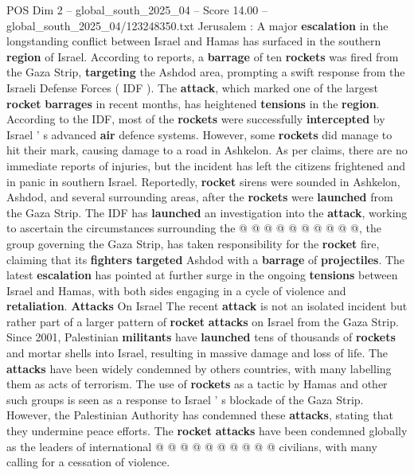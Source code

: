 \begin{textsample}{POS Dim 2 – global\_south\_2025\_04 – Score 14.00 – global\_south\_2025\_04/123248350.txt}  \label{ex:f2_pos_345}
Jerusalem : A major \textbf{escalation} in the longstanding conflict between Israel and Hamas has surfaced in the southern \textbf{region} of Israel.
According to reports, a \textbf{barrage} of ten \textbf{rockets} was fired from the Gaza Strip, \textbf{targeting} the Ashdod area, prompting a swift response from the Israeli Defense Forces ( IDF ).
The \textbf{attack}, which marked one of the largest \textbf{rocket} \textbf{barrages} in recent months, has heightened \textbf{tensions} in the \textbf{region}.
According to the IDF, most of the \textbf{rockets} were successfully \textbf{intercepted} by Israel ' s advanced \textbf{air} defence systems.
However, some \textbf{rockets} did manage to hit their mark, causing damage to a road in Ashkelon.
As per claims, there are no immediate reports of injuries, but the incident has left the citizens frightened and in panic in southern Israel.
Reportedly, \textbf{rocket} sirens were sounded in Ashkelon, Ashdod, and several surrounding areas, after the \textbf{rockets} were \textbf{launched} from the Gaza Strip.
The IDF has \textbf{launched} an investigation into the \textbf{attack}, working to ascertain the circumstances surrounding the @ @ @ @ @ @ @ @ @ @, the group governing the Gaza Strip, has taken responsibility for the \textbf{rocket} fire, claiming that its \textbf{fighters} \textbf{targeted} Ashdod with a \textbf{barrage} of \textbf{projectiles}.
The latest \textbf{escalation} has pointed at further surge in the ongoing \textbf{tensions} between Israel and Hamas, with both sides engaging in a cycle of violence and \textbf{retaliation}. \textbf{Attacks} On Israel The recent \textbf{attack} is not an isolated incident but rather part of a larger pattern of \textbf{rocket} \textbf{attacks} on Israel from the Gaza Strip.
Since 2001, Palestinian \textbf{militants} have \textbf{launched} tens of thousands of \textbf{rockets} and mortar shells into Israel, resulting in massive damage and loss of life.
The \textbf{attacks} have been widely condemned by others countries, with many labelling them as acts of terrorism.
The use of \textbf{rockets} as a tactic by Hamas and other such groups is seen as a response to Israel ' s blockade of the Gaza Strip.
However, the Palestinian Authority has condemned these \textbf{attacks}, stating that they undermine peace efforts.
The \textbf{rocket} \textbf{attacks} have been condemned globally as the leaders of international @ @ @ @ @ @ @ @ @ @ civilians, with many calling for a cessation of violence.

\end{textsample}

